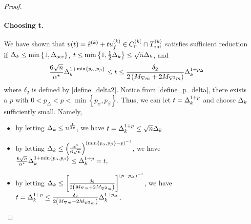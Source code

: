 \begin{proof}
\paragraph*{Choosing t.}

We have shown that $v(t) = {{\hat s}^{(k)}}  + t {u^{(k)}_f} \in {C^{(k)}_{\cap}} \cap {T_{\text{out}}^{(k)}}$ satisfies sufficient reduction 
if $\Delta_k \le \min\left\{1, {\Delta_{\textrm{acc}}}\right\}$, $t \le \min\left\{1, \frac 1 2 \Delta_k\right\} \le \sqrt{n} \Delta_k$, and
\begin{align*}
\frac{6 \sqrt{n}}{{ \alpha^{\star} }} \Delta_k^{1 + \min\left\{p_{\alpha}, p_{\beta}\right\}} \le t 
\le \frac {\delta_2}{2\left({M_{\nabla m}} + 2{M_{\nabla^2 m}}\right)} \Delta_k^{1 + p_{\Delta}}
\end{align*}
where $\delta_2$ is defined by \cref{define_delta2}.
Notice from \cref{define_p_delta}, there exists a $p$ with $0 < p_{\Delta} < p < \min\left\{p_{\alpha}, p_{\beta}\right\}$.
Thus, we can let $t = \Delta_k^{1+p}$ and choose $\Delta_k$ sufficiently small.
Namely,
\begin{itemize}
\item by letting 
$\Delta_k \le n^{\frac 1 {2p} }$, we have
$t = \Delta_k^{1+p} \le \sqrt{n} \Delta_k$
\item by letting 
$\Delta_k \le \left(\frac{{ \alpha^{\star} }}{6 \sqrt{n}}\right)^{\left(\min\left\{p_{\alpha}, p_{\beta}\right\} - p\right)^{-1}}$, we have
$\frac{6 \sqrt{n}}{{ \alpha^{\star} }} \Delta_k^{1 + \min\left\{p_{\alpha}, p_{\beta}\right\}} \le \Delta_k^{1+p} = t,$
\item by letting 
$\Delta_k \le \left[ \frac {\delta_2}{2\left({M_{\nabla m}} + 2{M_{\nabla^2 m}}\right)} \right]^{\left(p - p_{\Delta}\right)^{-1}}$, we have
$t = \Delta_k^{1+p} \le  \frac {\delta_2}{2\left({M_{\nabla m}} + 2{M_{\nabla^2 m}}\right)} \Delta_k^{1 + p_{\Delta}}$.
\end{itemize}





\end{proof}
